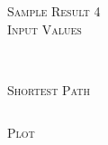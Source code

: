 \documentclass[pdftex,12pt,a4paper]{article}
\newcommand{\nspace}{\\[0.25cm]}
\begin{document}
\textsc{\large Sample Result 4} \hfill \nspace

\textsc{Input Values} \hfill \nspace

\begin{verbatim}
\end{verbatim}

\hfill \nspace
\textsc{Shortest Path} \hfill \nspace

\begin{verbatim}
\end{verbatim}


\textsc{Plot} \hfill \nspace

\begin{figure}[h!]
  \centering
\end{figure}















\end{document}
